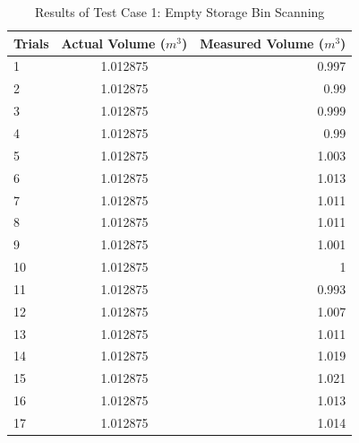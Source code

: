 \begin{table}[H]
	\centering
	\caption{Results of Test Case 1: Empty Storage Bin Scanning}
	\label{table:test_case_1_results}
	\begin{tabular}{l c r}
		\toprule
		\textbf{Trials} & \textbf{Actual Volume ($m^{3}$)} & \textbf{Measured Volume} ($m^{3}$) \\ \midrule

		1               & 1.012875                         & 0.997                              \\
		2               & 1.012875                         & 0.99                               \\
		3               & 1.012875                         & 0.999                              \\
		4               & 1.012875                         & 0.99                               \\
		5               & 1.012875                         & 1.003                              \\
		6               & 1.012875                         & 1.013                              \\
		7               & 1.012875                         & 1.011                              \\
		8               & 1.012875                         & 1.011                              \\
		9               & 1.012875                         & 1.001                              \\
		10              & 1.012875                         & 1                                  \\
		11              & 1.012875                         & 0.993                              \\
		12              & 1.012875                         & 1.007                              \\
		13              & 1.012875                         & 1.011                              \\
		14              & 1.012875                         & 1.019                              \\
		15              & 1.012875                         & 1.021                              \\
		16              & 1.012875                         & 1.013                              \\
		17              & 1.012875                         & 1.014                              \\

\end{tabular}
\end{table}

